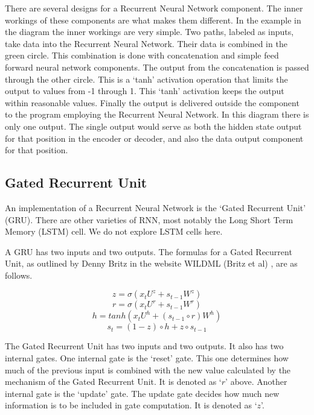 There are several designs for a Recurrent Neural Network component. The inner workings of these components are what makes them different. In the example in the diagram the inner workings are very simple. Two paths, labeled as inputs, take data into the Recurrent Neural Network. Their data is combined in the green circle. This combination is done with concatenation and simple feed forward neural network components. The output from the concatenation is passed through the other circle. This is a `tanh' activation operation that limits the output to values from -1 through 1. This `tanh' activation keeps the output within reasonable values. Finally the output is delivered outside the component to the program employing the Recurrent Neural Network. In this diagram there is only one output. The single output would serve as both the hidden state output for that position in the encoder or decoder, and also the data output component for that position.



\subsection{Gated Recurrent Unit}
An implementation of a Recurrent Neural Network is the `Gated Recurrent Unit' (GRU). There are other varieties of RNN, most notably the Long Short Term Memory (LSTM) cell. We do not explore \ac{LSTM} cells here.

A \ac{GRU} has two inputs and two outputs. The formulas for a Gated Recurrent Unit, as outlined by Denny Britz in the website WILDML (Britz et al) \cite{2015Britz}, are as follows.

\begin{minipage}{5in}

$$ z =\sigma(x_tU^z + s_{t-1} W^z) $$  
$$ r =\sigma(x_t U^r +s_{t-1} W^r) $$  
$$ h = tanh(x_t U^h + (s_{t-1} \circ r) W^h) $$  
$$ s_t = (1 - z) \circ h + z \circ s_{t-1} $$  

\end{minipage}

\bigskip \bigskip

The Gated Recurrent Unit has two inputs and two outputs. It also has two internal gates. One internal gate is the `reset' gate. This one determines how much of the previous input is combined with the new value calculated by the mechanism of the Gated Recurrent Unit. It is denoted as `$r$' above. Another internal gate is the `update' gate. The update gate decides how much new information is to be included in gate computation. It is denoted as `$z$'.


